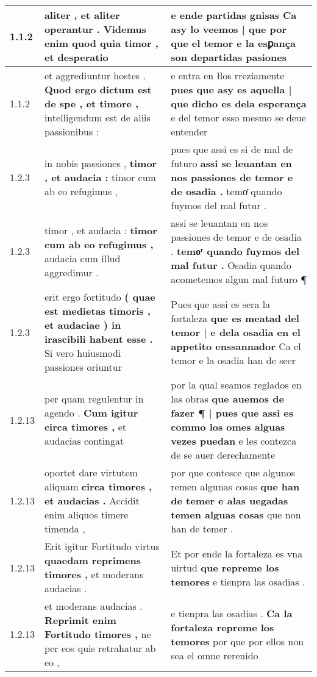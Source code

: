 \begin{tabular}{|p{1cm}|p{6.5cm}|p{6.5cm}|}

\hline
1.1.2 & aliter , et aliter operantur . \textbf{ Videmus enim quod quia timor , } et desperatio & e ende partidas gnisas \textbf{ Ca asy lo veemos | que por que el temor } e la esꝑança son departidas pasiones \\\hline
1.1.2 & et aggrediuntur hostes . \textbf{ Quod ergo dictum est de spe , et timore , } intelligendum est de aliis passionibus : & e entra en łlos rreziamente \textbf{ pues que asy es aquella | que dicho es dela esperança } e del temor esso mesmo se deue entender \\\hline
1.2.3 & in nobis passiones , \textbf{ timor , et audacia : } timor cum ab eo refugimus , & pues que assi es si de mal de futuro \textbf{ assi se leuantan en nos passiones de temor e de osadia . } temoͬ quando fuymos del mal futur . \\\hline
1.2.3 & timor , et audacia : \textbf{ timor cum ab eo refugimus , } audacia cum illud aggredimur . & assi se leuantan en nos passiones de temor e de osadia . \textbf{ temoͬ quando fuymos del mal futur . } Osadia quando acometemos algun mal futuro ¶ \\\hline
1.2.3 & erit ergo fortitudo \textbf{ ( quae est medietas timoris , et audaciae ) in irascibili habent esse . } Si vero huiusmodi passiones oriuntur & Pues que assi es sera la fortaleza \textbf{ que es meatad del temor | e dela osadia en el appetito enssannador } Ca el temor e la osadia han de seer \\\hline
1.2.13 & per quam regulentur in agendo . \textbf{ Cum igitur circa timores , } et audacias contingat & por la qual seamos reglados en las obras \textbf{ que auemos de fazer ¶ | pues que assi es commo los omes alguas vezes puedan } e les contezca de se auer derechamente \\\hline
1.2.13 & oportet dare virtutem aliquam \textbf{ circa timores , et audacias . } Accidit enim aliquos timere timenda , & por que contesce que algunos remen algunas cosas \textbf{ que han de temer e alas uegadas temen alguas cosas } que non han de temer . \\\hline
1.2.13 & Erit igitur Fortitudo virtus \textbf{ quaedam reprimens timores , } et moderans audacias . & Et por ende la fortaleza es vna uirtud \textbf{ que repreme los temores } e tienpra las osadias . \\\hline
1.2.13 & et moderans audacias . \textbf{ Reprimit enim Fortitudo timores , } ne per eos quis retrahatur ab eo , & e tienpra las osadias . \textbf{ Ca la fortaleza repreme los temores } por que por ellos non sea el omne rerenido \\\hline

\end{tabular}
